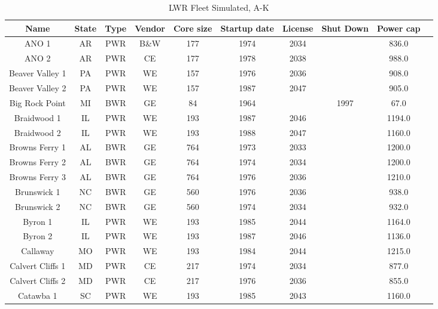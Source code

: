 \begin{table}[!ht]
    \centering
    \caption{LWR Fleet Simulated, A-K}
    \label{tab:lwr_fleet_1}
    \begin{tabular}{c c c c c c c c c c}
    \hline
    \textbf{Name} & \textbf{State} & \textbf{Type} & \textbf{Vendor} & \textbf{Core size} & \textbf{Startup date} & \textbf{License} & \textbf{Shut Down} & \textbf{Power cap} \\
    \hline
    ANO 1                 &AR & PWR & B\&W & 177 & 1974 & 2034 &      & 836.0 \\
    ANO 2                 &AR & PWR & CE   & 177 & 1978 & 2038 &      & 988.0 \\
    Beaver Valley 1       &PA & PWR & WE   & 157 & 1976 & 2036 &      & 908.0 \\
    Beaver Valley 2       &PA & PWR & WE   & 157 & 1987 & 2047 &      & 905.0 \\
    Big Rock Point        &MI & BWR & GE   & 84  & 1964 &      & 1997 & 67.0  \\
    Braidwood 1           &IL & PWR & WE   & 193 & 1987 & 2046 &      & 1194.0\\
    Braidwood 2           &IL & PWR & WE   & 193 & 1988 & 2047 &      & 1160.0\\
    Browns Ferry 1        &AL & BWR & GE   & 764 & 1973 & 2033 &      & 1200.0\\
    Browns Ferry 2        &AL & BWR & GE   & 764 & 1974 & 2034 &      & 1200.0\\
    Browns Ferry 3        &AL & BWR & GE   & 764 & 1976 & 2036 &      & 1210.0\\
    Brunswick 1           &NC & BWR & GE   & 560 & 1976 & 2036 &      & 938.0 \\
    Brunswick 2           &NC & BWR & GE   & 560 & 1974 & 2034 &      & 932.0 \\
    Byron 1               &IL & PWR & WE   & 193 & 1985 & 2044 &      & 1164.0\\
    Byron 2               &IL & PWR & WE   & 193 & 1987 & 2046 &      & 1136.0\\
    Callaway              &MO & PWR & WE   & 193 & 1984 & 2044 &      & 1215.0\\
    Calvert Cliffs 1      &MD & PWR & CE   & 217 & 1974 & 2034 &      & 877.0 \\
    Calvert Cliffs 2      &MD & PWR & CE   & 217 & 1976 & 2036 &      & 855.0 \\
    Catawba 1             &SC & PWR & WE   & 193 & 1985 & 2043 &      & 1160.0\\

\end{tabular}
\end{table}
